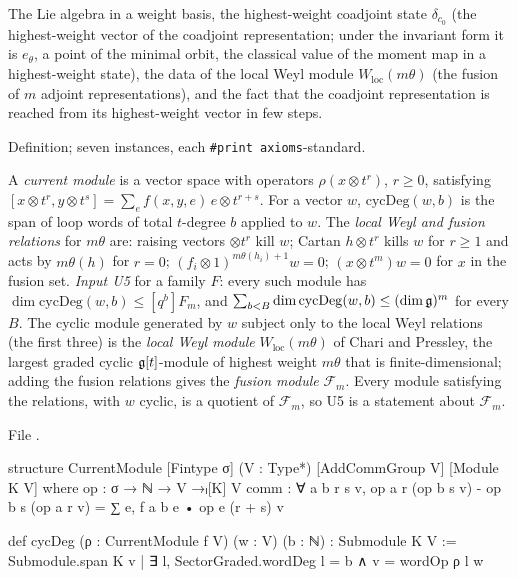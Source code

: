 \begin{physics}
The Lie algebra in a weight basis, the highest-weight coadjoint state $\delta_{c_0}$ (the highest-weight vector of the
coadjoint representation; under the invariant form it is $e_\theta$, a point of the minimal orbit, the classical value of
the moment map in a highest-weight state),
the data of the local Weyl module $W_{\mathrm{loc}}(m\theta)$ (the fusion of $m$ adjoint representations), and the
fact that the coadjoint representation is reached from its highest-weight vector in few steps.
\end{physics}

\begin{status}
Definition; seven instances, each \texttt{\#print axioms}-standard.
\end{status}

\begin{definition}\label{l24:def:U5}
A \emph{current module} is a vector space with operators $\rho(x\otimes t^r)$, $r\ge0$, satisfying
$[x\otimes t^r,y\otimes t^s]=\sum_ef(x,y,e)\,e\otimes t^{r+s}$. For a vector $w$, $\mathrm{cycDeg}(w,b)$ is the span of
loop words of total $t$-degree $b$ applied to $w$. The \emph{local Weyl and fusion relations} for $m\theta$ are:
raising vectors $\otimes t^r$ kill $w$; Cartan $h\otimes t^r$ kills $w$ for $r\ge1$ and acts by $m\theta(h)$ for
$r=0$; $(f_i\otimes1)^{m\theta(h_i)+1}w=0$; $(x\otimes t^m)w=0$ for $x$ in the fusion set. \emph{Input U5} for a
family $F$: every such module has $\dim\mathrm{cycDeg}(w,b)\le[q^b]F_m$, and
$\sum_{b<B}\dim\mathrm{cycDeg}(w,b)\le(\dim\mathfrak g)^m$ for every $B$.
The cyclic module generated by $w$ subject only to the local Weyl relations (the first three) is the \emph{local Weyl
module} $W_{\mathrm{loc}}(m\theta)$ of Chari and Pressley, the largest graded cyclic $\mathfrak g[t]$-module of highest weight
$m\theta$ that is finite-dimensional; adding the fusion relations gives the \emph{fusion module} $\mathcal F_m$. Every
module satisfying the relations, with $w$ cyclic, is a quotient of $\mathcal F_m$, so U5 is a statement about $\mathcal F_m$.
\end{definition}
\noindent File .
\begin{leancode}
structure CurrentModule [Fintype σ] (V : Type*) [AddCommGroup V] [Module K V] where
  op : σ → ℕ → V →ₗ[K] V
  comm : ∀ a b r s v, op a r (op b s v) - op b s (op a r v) = ∑ e, f a b e • op e (r + s) v

def cycDeg (ρ : CurrentModule f V) (w : V) (b : ℕ) : Submodule K V :=
  Submodule.span K {v | ∃ l, SectorGraded.wordDeg l = b ∧ v = wordOp ρ l w}
\end{leancode}
